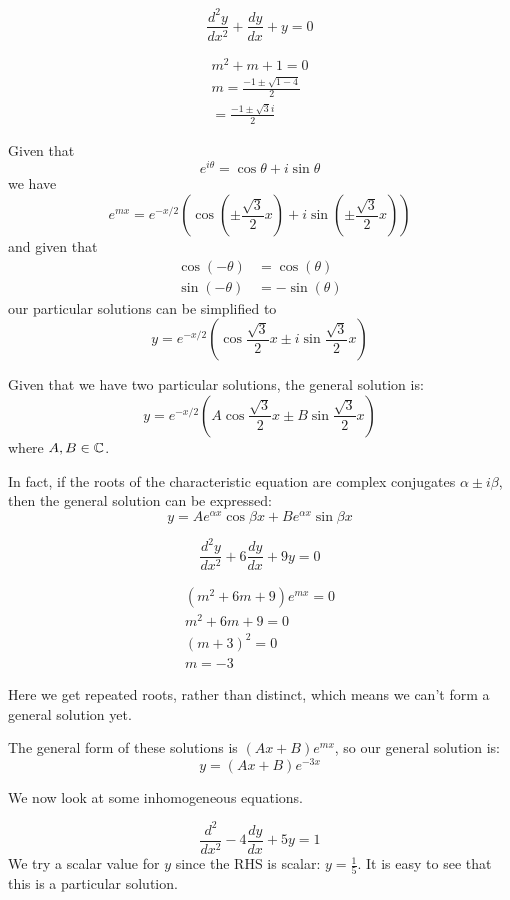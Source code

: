 \documentclass[a4paper,10pt]{article}
\begin{document}
\begin{ex}
	\[
		\frac{d^2y}{dx^2} + \frac{dy}{dx} + y = 0
	\]

	\begin{gather*}
		m^2 + m + 1 = 0 \\
		m = \frac{-1 \pm \sqrt{1-4}}{2} \\
		= \frac{-1 \pm \sqrt{3}i}{2}
	\end{gather*}

	Given that
	\[
		e^{i\theta} = \cos{\theta} + i\sin{\theta}
	\]
	we have
	\[
		e^{mx} = e^{-x/2}\left(\cos(\pm \frac{\sqrt{3}}{2}x)
		+ i\sin(\pm\frac{\sqrt{3}}{2}x)\right)
	\]
	and given that
	\begin{align*}
		\cos(-\theta) &= \cos(\theta) \\
		\sin(-\theta) &= -\sin(\theta)
	\end{align*}
	our particular solutions can be simplified to
	\[
		y = e^{-x/2}\left(\cos \frac{\sqrt{3}}{2}x
		\pm i\sin\frac{\sqrt{3}}{2}x\right)
	\]

	Given that we have two particular solutions, the general solution is:
	\[
		y = e^{-x/2}\left(A\cos \frac{\sqrt{3}}{2}x
		\pm B\sin\frac{\sqrt{3}}{2}x\right)
	\]
	where $A,B \in \mathbb{C}$.

	In fact, if the roots of the characteristic equation are complex
	conjugates $\alpha \pm i\beta$, then the general solution can be
	expressed:
	\[
		y = Ae^{\alpha x}\cos\beta x + Be^{\alpha x}\sin\beta x
	\]

\end{ex}

\begin{ex}
	\[
		\frac{d^2y}{dx^2} + 6 \frac{dy}{dx} + 9y = 0
	\]

	\begin{gather*}
		(m^2 + 6m + 9)e^{mx} = 0 \\
		m^2 + 6m + 9 = 0 \\
		(m+3)^2  = 0 \\
		m = -3
	\end{gather*}

	Here we get repeated roots, rather than distinct, which means we
	can't form a general solution yet.

	The general form of these solutions is $(Ax+B)e^{mx}$, so our
	general solution is:
	\[
		y = (Ax+B)e^{-3x}
	\]
\end{ex}

We now look at some inhomogeneous equations.

\begin{ex}
	\[
		\frac{d^2}{dx^2} - 4\frac{dy}{dx} + 5y = 1
	\]
	We try a scalar value for $y$ since the RHS is scalar: $y =
	\frac{1}{5}$. It is easy to see that this is a particular
	solution.
\end{ex}
\end{document}
